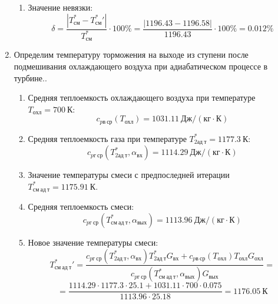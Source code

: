 \documentclass[a4paper,10pt]{article}
\begin{document}
\begin{enumerate}
\begin{enumerate}
            \item Значение невязки:
            \[
                \delta = \frac{ \left| T_{см}^{*} - T_{см}^*\prime \right| }{T_{см}^{*}} \cdot 100 \% =
                    \frac{
                        \left| 1196.43 - 1196.58 \right|
                    }{
                        1196.43
                    } \cdot 100 \% =
                0.012 \%
            \]
        \end{enumerate}


        \item Определим температуру торможения на выходе из ступени после подмешивания охлаждающего воздуха при адиабатическом процессе в турбине..
        \begin{enumerate}

            \item Средняя теплоемкость охлаждающего воздуха при температуре $T_{охл} = 700\ К $:
            \[
                c_{pв\ ср} (T_{охл}) = 1031.11\ Дж/ (кг \cdot К)
            \]

            \item Средняя теплоемкость газа при температуре $T_{2ад\ т}^* = 1177.3 \ К $:
            \[
                c_{pг\ ср} (T_{2ад\ т}^*, \alpha_{вх}) =
                1114.29\ Дж/ (кг \cdot К)
            \]

            \item Значение температуры смеси с предпоследней итерации $T_{см\ ад\ т}^{*} = 1175.91\ К$.

            \item Средняя теплоемкость смеси:
            \[
                c_{pг\ ср} (T_{см\ ад\ т}^{*}, \alpha_{вых}) =
                1113.96\ Дж/ (кг \cdot К)
            \]

            \item Новое значение температуры смеси:
            \[
                T_{см\ ад\ т}^*\prime = \frac{
                        c_{pг\ ср} (T_{2ад\ т}^*, \alpha_{вх}) T_{2ад\ т}^* G_{вх} + c_{pв\ ср} (T_{охл}) T_{охл} G_{охл}
                    }{
                        c_{pг\ ср} (T_{см\ ад\ т}^{*}, \alpha_{вых}) G_{вых}
                    } =
            \]
            \[    = \frac{
                    1114.29
                    \cdot 1177.3 \cdot 25.1 +
                    1031.11
                    \cdot 700 \cdot 0.075
                }{
                    1113.96
                    \cdot  25.18
                } =
                1176.05\ К
            \]


\end{enumerate}
\end{enumerate}
\end{document}
